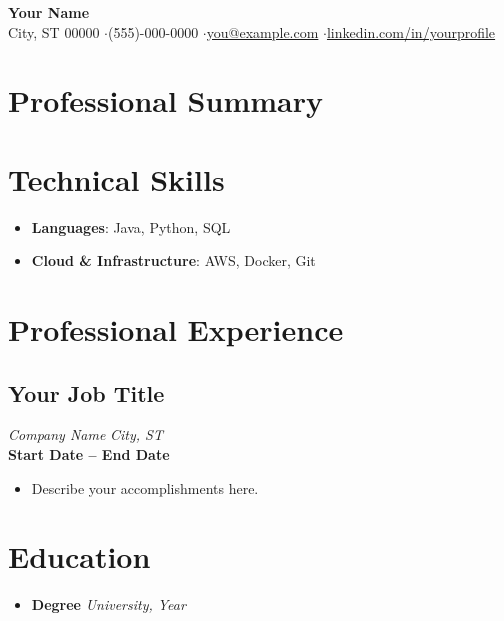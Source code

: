 \documentclass[a4paper,10pt]{article}
\begin{document}
\begin{center}
    {\LARGE\textbf{Your Name}} \\[6pt]
    City, ST 00000 \enspace$\cdot$\enspace (555)-000-0000 \enspace$\cdot$\enspace \href{mailto:you@example.com}{you@example.com} \enspace$\cdot$\enspace \href{https://www.linkedin.com/in/yourprofile/}{linkedin.com/in/yourprofile}
\end{center}

\section*{Professional Summary}

\section*{Technical Skills}
\begin{itemize}
    \item \textbf{Languages}: Java, Python, SQL
    \item \textbf{Cloud \& Infrastructure}: AWS, Docker, Git
\end{itemize}

\section*{Professional Experience}

\subsection*{Your Job Title}
\textit{Company Name} \hfill \textit{City, ST} \\
\textbf{Start Date -- End Date} \\
\begin{itemize}
    \item Describe your accomplishments here.
\end{itemize}

\section*{Education}
\begin{itemize}
    \item \textbf{Degree} \hfill \textit{University, Year}
\end{itemize}
\end{document}
